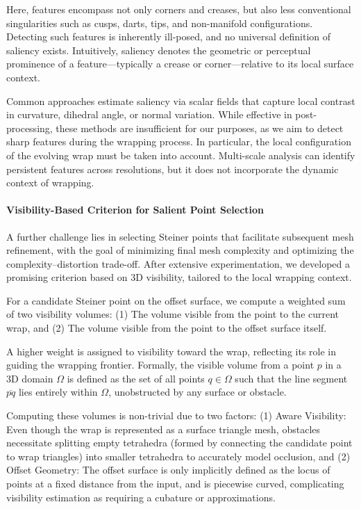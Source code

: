 Here, features encompass not only corners and creases, but also less conventional singularities such as cusps, darts, tips, and non-manifold configurations. Detecting such features is inherently ill-posed, and no universal definition of saliency exists. Intuitively, saliency denotes the geometric or perceptual prominence of a feature—typically a crease or corner—relative to its local surface context.

Common approaches estimate saliency via scalar fields that capture local contrast in curvature, dihedral angle, or normal variation. While effective in post-processing, these methods are insufficient for our purposes, as we aim to detect sharp features during the wrapping process. In particular, the local configuration of the evolving wrap must be taken into account. Multi-scale analysis can identify persistent features across resolutions, but it does not incorporate the dynamic context of wrapping.

\paragraph{Visibility-Based Criterion for Salient Point Selection}

A further challenge lies in selecting Steiner points that facilitate subsequent mesh refinement, with the goal of minimizing final mesh complexity and optimizing the complexity–distortion trade-off. After extensive experimentation, we developed a promising criterion based on 3D visibility, tailored to the local wrapping context.

For a candidate Steiner point on the offset surface, we compute a weighted sum of two visibility volumes: (1) The volume visible from the point to the current wrap, and (2) The volume visible from the point to the offset surface itself.


A higher weight is assigned to visibility toward the wrap, reflecting its role in guiding the wrapping frontier. Formally, the visible volume from a point $p$ in a 3D domain $\Omega$ is defined as the set of all points $q \in \Omega$ such that the line segment $\overline{pq}$ lies entirely within $\Omega$, unobstructed by any surface or obstacle.

Computing these volumes is non-trivial due to two factors: (1) Aware Visibility: Even though the wrap is represented as a surface triangle mesh, obstacles necessitate splitting empty tetrahedra (formed by connecting the candidate point to wrap triangles) into smaller tetrahedra to accurately model occlusion, and (2) Offset Geometry: The offset surface is only implicitly defined as the locus of points at a fixed distance from the input, and is piecewise curved, complicating visibility estimation as requiring a cubature or approximations.

